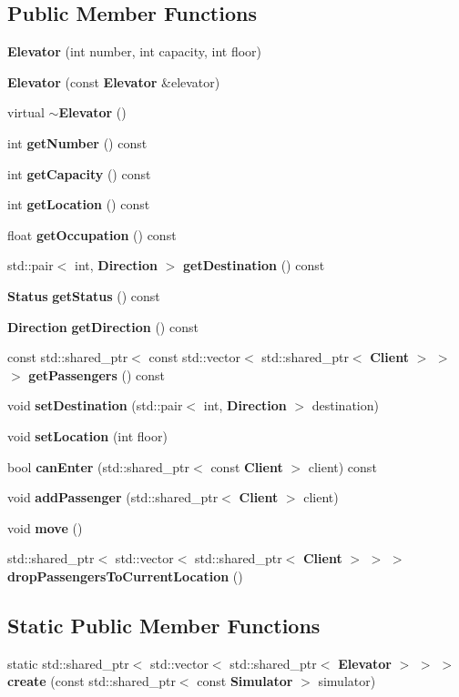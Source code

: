 \subsection*{Public Member Functions}
\begin{DoxyCompactItemize}
\item 
{\bf Elevator} (int number, int capacity, int floor)
\item 
{\bf Elevator} (const {\bf Elevator} \&elevator)
\item 
virtual {\bf $\sim$\+Elevator} ()
\item 
int {\bf get\+Number} () const 
\item 
int {\bf get\+Capacity} () const 
\item 
int {\bf get\+Location} () const 
\item 
float {\bf get\+Occupation} () const 
\item 
std\+::pair$<$ int, {\bf Direction} $>$ {\bf get\+Destination} () const 
\item 
{\bf Status} {\bf get\+Status} () const 
\item 
{\bf Direction} {\bf get\+Direction} () const 
\item 
const std\+::shared\+\_\+ptr$<$ const std\+::vector$<$ std\+::shared\+\_\+ptr$<$ {\bf Client} $>$ $>$ $>$ {\bf get\+Passengers} () const 
\item 
void {\bf set\+Destination} (std\+::pair$<$ int, {\bf Direction} $>$ destination)
\item 
void {\bf set\+Location} (int floor)
\item 
bool {\bf can\+Enter} (std\+::shared\+\_\+ptr$<$ const {\bf Client} $>$ client) const 
\item 
void {\bf add\+Passenger} (std\+::shared\+\_\+ptr$<$ {\bf Client} $>$ client)
\item 
void {\bf move} ()
\item 
std\+::shared\+\_\+ptr$<$ std\+::vector$<$ std\+::shared\+\_\+ptr$<$ {\bf Client} $>$ $>$ $>$ {\bf drop\+Passengers\+To\+Current\+Location} ()
\end{DoxyCompactItemize}
\subsection*{Static Public Member Functions}
\begin{DoxyCompactItemize}
\item 
static std\+::shared\+\_\+ptr$<$ std\+::vector$<$ std\+::shared\+\_\+ptr$<$ {\bf Elevator} $>$ $>$ $>$ {\bf create} (const std\+::shared\+\_\+ptr$<$ const {\bf Simulator} $>$ simulator)
\end{DoxyCompactItemize}


